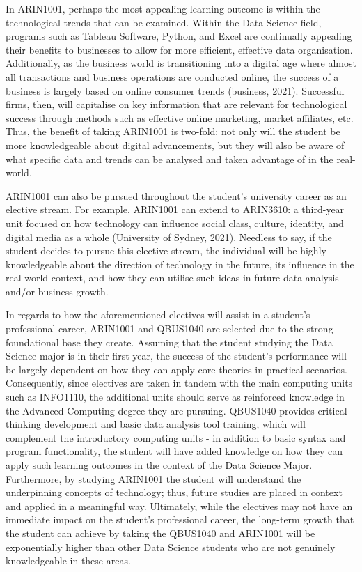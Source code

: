 In ARIN1001, perhaps the most appealing learning outcome is within the technological trends that can be examined. Within the Data Science field, programs such as Tableau Software, Python, and Excel are continually appealing their benefits to businesses to allow for more efficient, effective data organisation. Additionally, as the business world is transitioning into a digital age where almost all transactions and business operations are conducted online, the success of a business is largely based on online consumer trends (business, 2021). Successful firms, then, will capitalise on key information that are relevant for technological success through methods such as effective online marketing, market affiliates, etc. Thus, the benefit of taking ARIN1001 is two-fold: not only will the student be more knowledgeable about digital advancements, but they will also be aware of what specific data and trends can be analysed and taken advantage of in the real-world. 


ARIN1001 can also be pursued throughout the student’s university career as an elective stream. For example, ARIN1001 can extend to ARIN3610: a third-year unit focused on how technology can influence social class, culture, identity, and digital media as a whole (University of Sydney, 2021). Needless to say, if the student decides to pursue this elective stream, the individual will be highly knowledgeable about the direction of technology in the future, its influence in the real-world context, and how they can utilise such ideas in future data analysis and/or business growth. 


In regards to how the aforementioned electives will assist in a student’s professional career, ARIN1001 and QBUS1040 are selected due to the strong foundational base they create. Assuming that the student studying the Data Science major is in their first year, the success of the student’s performance will be largely dependent on how they can apply core theories in practical scenarios. Consequently, since electives are taken in tandem with the main computing units such as INFO1110, the additional units should serve as reinforced knowledge in the Advanced Computing degree they are pursuing. QBUS1040 provides critical thinking development and basic data analysis tool training, which will complement the introductory computing units - in addition to basic syntax and program functionality, the student will have added knowledge on how they can apply such learning outcomes in the context of the Data Science Major. Furthermore, by studying ARIN1001 the student will understand the underpinning concepts of technology; thus, future studies are placed in context and applied in a meaningful way. Ultimately, while the electives may not have an immediate impact on the student’s professional career, the long-term growth that the student can achieve by taking the QBUS1040 and ARIN1001 will be exponentially higher than other Data Science students who are not genuinely knowledgeable in these areas. 



